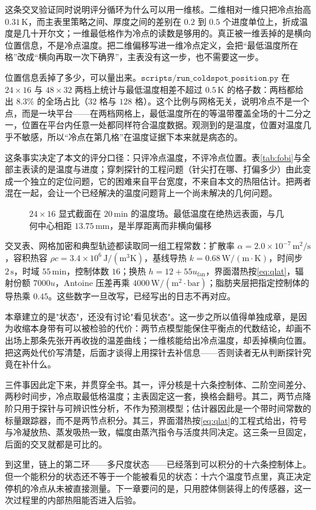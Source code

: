 这条交叉验证同时说明评分循环为什么可以用一维核。二维相对一维只把冷点抬高 \(0.31\,\mathrm{K}\)，而主表里策略之间、厚度之间的差别在 \(0.2\) 到 \(0.5\) 个进度单位上，折成温度是几十开尔文；一维最低格作为冷点的读数是够用的。真正被一维丢掉的是横向位置信息，不是冷点温度。把二维偏移写进一维冷点定义，会把“最低温度所在格”改成“横向再取一次下确界”，主表没有这一步，也不需要这一步。

位置信息丢掉了多少，可以量出来。\(\texttt{scripts/run\_coldspot\_position.py}\) 在 \(24\times16\) 与 \(48\times32\) 两档上统计与最低温度相差不超过 \(0.5\,\mathrm{K}\) 的格子数：两档都给出 \(8.3\%\) 的全场占比（\(32\) 格与 \(128\) 格）。这个比例与网格无关，说明冷点不是一个点，而是一块平台——在两档网格上，最低温度所在的等温带覆盖全场的十二分之一，位置在平台内任意一处都同样符合温度数据。观测到的是温度，位置对温度几乎不敏感，所以“冷点在第几格”在温度证据下本来就是病态的。

这条事实决定了本文的评分口径：只评冷点温度，不评冷点位置。表\ref{tab:fobi}{}与全部主表读的是温度与进度；穿刺探针的工程问题（针尖打在哪、打偏多少）由此变成一个独立的定位问题，它的困难来自平台宽度，不来自本文的热阻估计。把两者混在一起，会让一个已经解决的温度问题背上一个尚未解决的几何问题。

\begin{figure}[htbp]
\centering
{}
\caption{\(24\times 16\) 显式截面在 \(20\,\mathrm{min}\) 的温度场。最低温度在绝热远表面，与几何中心相距 \(13.75\,\mathrm{mm}\)，是半厚距离而非横向偏移}
\label{fig:t2grid}
\end{figure}

交叉表、网格加密和典型轨迹都读取同一组工程常数：扩散率 \(\alpha=2.0\times 10^{-7}\,\mathrm{m}^2/\mathrm{s}\)，容积热容 \(\rho c=3.4\times 10^{6}\,\mathrm{J}/(\mathrm{m}^3\mathrm{K})\)，基线导热 \(k=0.68\,\mathrm{W}/(\mathrm{m\cdot K})\)，时间步 \(2\,\mathrm{s}\)，时域 \(55\,\mathrm{min}\)，控制体数 \(16\)；换热 \(h=12+55u_{\mathrm{fan}}\)，界面潜热按\eqref{eq:qlat}，辐射份额 \(7000u\)，Antoine 压差再乘 \(4000\,\mathrm{W}/(\mathrm{m}^2\cdot\mathrm{bar})\)；脂肪夹层把指定控制体的导热乘 \(0.45\)。这些数字一旦改写，已经写出的日志不再对应。


本章建立的是"状态"，还没有讨论"看见状态"。这一步之所以值得单独成章，是因为收缩本身带有可以被检验的代价：两节点模型能保住平衡点的代数结论，却画不出场上那条先张开再收拢的温差曲线；一维核能给出冷点温度，却丢掉横向位置。把这两处代价写清楚，后面才谈得上用探针去补信息——否则读者无从判断探针究竟在补什么。

三件事因此定下来，并贯穿全书。其一，评分核是十六条控制体、二阶空间差分、两秒时间步，冷点取最低格温度；主表固定这一套，换格会翻号。其二，两节点降阶只用于探针与可辨识性分析，不作为预测模型；估计器因此是一个带时间常数的标量跟踪器，而不是两节点积分。其三，界面潜热按\eqref{eq:qlat}的工程式给出，符号与冷凝放热、蒸发吸热一致，幅度由蒸汽指令与活度共同决定。这三条一旦固定，后面的交叉就都是可比的。

到这里，链上的第二环——多尺度状态——已经落到可以积分的十六条控制体上。但一个能积分的状态还不等于一个能被看见的状态：十六个温度节点里，真正决定停机的冷点从未被直接测量。下一章要问的是，只用腔体侧装得上的传感器，这一次过程里的内部热阻能否进入后验。